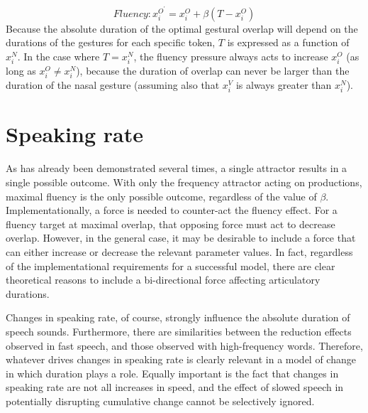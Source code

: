 \begin{equation}
\textit{Fluency}:x_{i}^{O^{\prime}}=x_{i}^{O}+\beta(T-x_{i}^{O})\label{eq:Frequency attractor}
\end{equation}
Because the absolute duration of the optimal gestural overlap will
depend on the durations of the gestures for each specific token, $T$
is expressed as a function of $x_{i}^{N}$. In the case where $T=x_{i}^{N}$,
the fluency pressure always acts to increase $x_{i}^{O}$ (as long
as $x_{i}^{O}\neq x_{i}^{N}$), because the duration of overlap can
never be larger than the duration of the nasal gesture (assuming also
that $x_{i}^{V}$ is always greater than $x_{i}^{N}$). 

\section{Speaking rate}

As has already been demonstrated several times, a single attractor
results in a single possible outcome. With only the frequency attractor
acting on productions, maximal fluency is the only possible outcome,
regardless of the value of $\beta$. Implementationally, a force is
needed to counter-act the fluency effect. For a fluency target at
maximal overlap, that opposing force must act to decrease overlap.
However, in the general case, it may be desirable to include a force
that can either increase or decrease the relevant parameter values.
In fact, regardless of the implementational requirements for a successful
model, there are clear theoretical reasons to include a bi-directional
force affecting articulatory durations. 

Changes in speaking rate, of course, strongly influence the absolute
duration of speech sounds. Furthermore, there are similarities between
the reduction effects observed in fast speech, and those observed
with high-frequency words. Therefore, whatever drives changes in speaking
rate is clearly relevant in a model of change in which duration plays
a role. Equally important is the fact that changes in speaking rate
are not all increases in speed, and the effect of slowed speech in
potentially disrupting cumulative change cannot be selectively ignored. 

